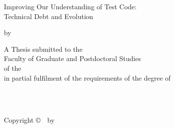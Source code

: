 \begin{titlepage}
\begin{center}

\vspace*{1.5cm}

{\Large
\begin{minipage}{0.95\textwidth}
\centering
Improving Our Understanding of Test Code:\\
Technical Debt and Evolution
\end{minipage}
\par}

\vspace{1.5cm}

by

\vspace{1cm}

{\Large \AuthorName\par}

\vspace{1.5cm}

A Thesis submitted to the\\
Faculty of Graduate and Postdoctoral Studies\\
of the \UniversityName\\
in partial fulfilment of the requirements of the degree of

\vspace{1cm}

\DegreeName

\vspace{1cm}

\DepartmentName\\
\UniversityName\\
\CityName

\vfill

Copyright \copyright\ \CopyrightYear\ by \AuthorName

\end{center}
\end{titlepage}
